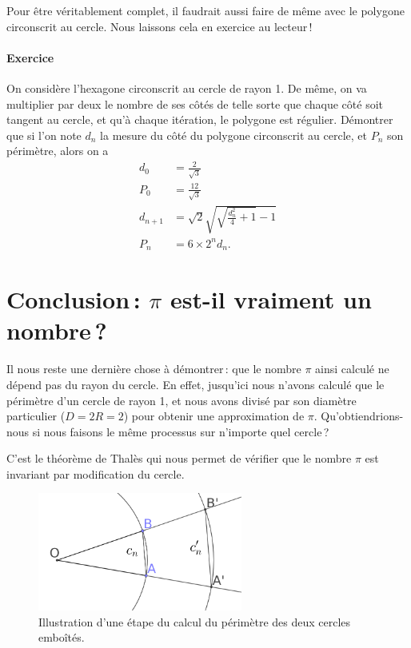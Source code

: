 	Pour être véritablement complet, il faudrait aussi faire de même avec le polygone circonscrit au cercle. Nous laissons cela en exercice au lecteur\,!

	\paragraph{Exercice} On considère l'hexagone circonscrit au cercle de rayon 1. De même, on va multiplier par deux le nombre de ses côtés de telle sorte que chaque côté soit tangent au cercle, et qu'à chaque itération, le polygone est régulier. Démontrer que si l'on note $d_n$ la mesure du côté du polygone circonscrit au cercle, et $P_n$ son périmètre, alors on a
	\begin{align}
		d_0&=\frac{2}{\sqrt{3}} \\
		P_0&=\frac{12}{\sqrt{3}} \\
		d_{n+1}&=\sqrt{2}\sqrt{\sqrt{\frac{d_n^2}{4}+1}-1} \label{eq_dnpu}\\
		P_n&=6\times 2^n d_n.
	\end{align}

\section{Conclusion\,: $\pi$ est-il vraiment un nombre\,?}
	Il nous reste une dernière chose à démontrer\,: que le nombre $\pi$ ainsi calculé ne dépend pas du rayon du cercle. En effet, jusqu'ici nous n'avons calculé que le périmètre d'un cercle de rayon 1, et nous avons divisé par son diamètre particulier ($D=2R=2$) pour obtenir une approximation de $\pi$. Qu'obtiendrions-nous si nous faisons le même processus sur n'importe quel cercle\,?

	C'est le théorème de Thalès qui nous permet de vérifier que le nombre $\pi$ est invariant par modification du cercle.

	\begin{figure}
		\includegraphics[width=0.6\textwidth]{image/pi_nombre/thales.png}
		\caption{Illustration d'une étape du calcul du périmètre des deux cercles emboîtés.}\label{fig_semblabilite}
	\end{figure}


